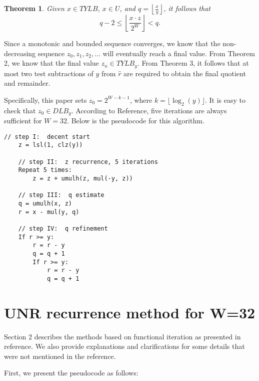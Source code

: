 \documentclass[12pt]{elsarticle}
\newtheorem{theorem}{Theorem}
\begin{document}
\begin{theorem}\cite{rodeheffer2008software}\label{thm3}
    Given \( x \in TYLB \), \( x \in U \), and \( q = \left\lfloor \frac{x}{y} \right\rfloor \), it follows that
    \[
    q - 2 \le \left\lfloor \frac{x \cdot z }{2^W} \right\rfloor < q.
    \]
\end{theorem}

Since a monotonic and bounded sequence converges, we know that the non-decreasing sequence \( z_0, z_1, z_2, \ldots \) will eventually reach a final value. From Theorem 2, we know that the final value \( z_n \in TYLB_y \). From Theorem 3, it follows that at most two test subtractions of \( y \) from \( \hat{r} \) are required to obtain the final quotient and remainder.





Specifically, this paper\cite{rodeheffer2008software} sets \( z_0 = 2^{W-k-1} \), where \( k = \lfloor \log_2(y) \rfloor \). It is easy to check that \( z_0 \in DLB_y \). According to Reference\cite{rodeheffer2008software}, five iterations are always sufficient for \( W = 32 \). Below is the pseudocode for this algorithm. \\


\begin{Verbatim}[frame=single, fontsize=\small, label={Algorithm 1: UNR recurrence method for W=32.}]
    // step I:  decent start
    z = lsl(1, clz(y))
    
    // step II:  z recurrence, 5 iterations
    Repeat 5 times:
        z = z + umulh(z, mul(-y, z))
    
    // step III:  q estimate
    q = umulh(x, z)
    r = x - mul(y, q)
    
    // step IV:  q refinement
    If r >= y:
        r = r - y
        q = q + 1
        If r >= y:
            r = r - y
            q = q + 1
    \end{Verbatim}


 
\section{UNR recurrence method for W=32}
Section 2 describes the methods based on functional iteration as presented in reference\cite{rodeheffer2008software}. We also provide explanations and clarifications for some details that were not mentioned in the reference.

First, we present the pseudocode as follows:
\end{document}
